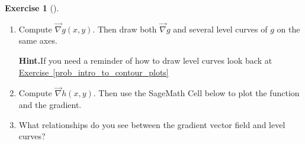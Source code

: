 \documentclass[10pt,]{book}
\theoremstyle{plain}
\theoremstyle{definition}
\theoremstyle{definition}
\theoremstyle{definition}
\theoremstyle{definition}
\newtheorem{exploration}[project]{Exercise}
\theoremstyle{definition}
\numberwithin{equation}{section}
\begin{document}
\begin{exploration}[]
\begin{enumerate}[font=\bfseries,label=(\alph*),ref=\alph*]
\item\label{task-591} Compute \(\vec \nabla g(x,y)\).  Then draw both \(\vec \nabla g\) and several level curves of \(g\) on the same axes.%
\par\medskip\noindent%
\textbf{Hint.}\quad If you need a reminder of how to draw level curves look back at \hyperref[prob_intro_to_contour_plots]{Exercise~\ref{prob_intro_to_contour_plots}}%
\item\label{task-592} Compute \(\vec \nabla h(x,y)\). Then use the SageMath Cell below to plot the function and the gradient.%
\item\label{task-593} What relationships do you see between the gradient vector field and level curves?%
\end{enumerate}
\end{exploration}
\typeout{************************************************}
\typeout{************************************************}
\end{document}
